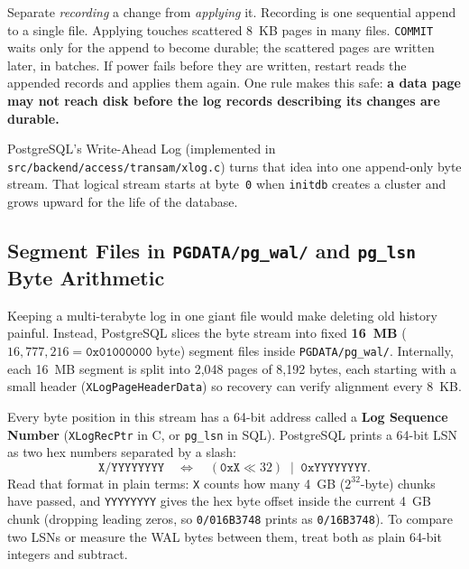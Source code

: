 \begin{intuitionbox}
Separate \emph{recording} a change from \emph{applying} it. Recording is one sequential append to a single file. Applying touches scattered 8~KB pages in many files. \texttt{COMMIT} waits only for the append to become durable; the scattered pages are written later, in batches. If power fails before they are written, restart reads the appended records and applies them again. One rule makes this safe: \textbf{a data page may not reach disk before the log records describing its changes are durable.}
\end{intuitionbox}

PostgreSQL's Write-Ahead Log (implemented in \texttt{src/backend/access/transam/xlog.c}) turns that idea into one append-only byte stream. That logical stream starts at byte~\texttt{0} when \texttt{initdb} creates a cluster and grows upward for the life of the database.

\subsection{Segment Files in \texttt{PGDATA/pg\_wal/} and \texttt{pg\_lsn} Byte Arithmetic}

Keeping a multi-terabyte log in one giant file would make deleting old history painful. Instead, PostgreSQL slices the byte stream into fixed \textbf{16~MB} ($16{,}777{,}216 = \texttt{0x01000000}$ byte) segment files inside \texttt{PGDATA/pg\_wal/}. Internally, each 16~MB segment is split into 2,048 pages of 8,192 bytes, each starting with a small header (\texttt{XLogPageHeaderData}) so recovery can verify alignment every 8~KB.

Every byte position in this stream has a 64-bit address called a \textbf{Log Sequence Number} (\texttt{XLogRecPtr} in C, or \texttt{pg\_lsn} in SQL). PostgreSQL prints a 64-bit LSN as two hex numbers separated by a slash:
\[
  \texttt{X/YYYYYYYY} \quad\Longleftrightarrow\quad (\texttt{0xX} \ll 32) \;\mid\; \texttt{0xYYYYYYYY}.
\]
Read that format in plain terms: \texttt{X} counts how many 4~GB ($2^{32}$-byte) chunks have passed, and \texttt{YYYYYYYY} gives the hex byte offset inside the current 4~GB chunk (dropping leading zeros, so \texttt{0/016B3748} prints as \texttt{0/16B3748}). To compare two LSNs or measure the WAL bytes between them, treat both as plain 64-bit integers and subtract.

